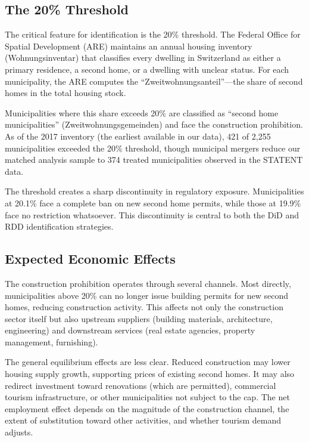 \documentclass[12pt]{article}
\begin{document}
\subsection{The 20\% Threshold}

The critical feature for identification is the 20\% threshold. The Federal Office for Spatial Development (ARE) maintains an annual housing inventory (Wohnungsinventar) that classifies every dwelling in Switzerland as either a primary residence, a second home, or a dwelling with unclear status. For each municipality, the ARE computes the ``Zweitwohnungsanteil''---the share of second homes in the total housing stock.

Municipalities where this share exceeds 20\% are classified as ``second home municipalities'' (Zweitwohnungsgemeinden) and face the construction prohibition. As of the 2017 inventory (the earliest available in our data), 421 of 2,255 municipalities exceeded the 20\% threshold, though municipal mergers reduce our matched analysis sample to 374 treated municipalities observed in the STATENT data.

The threshold creates a sharp discontinuity in regulatory exposure. Municipalities at 20.1\% face a complete ban on new second home permits, while those at 19.9\% face no restriction whatsoever. This discontinuity is central to both the DiD and RDD identification strategies.

\subsection{Expected Economic Effects}

The construction prohibition operates through several channels. Most directly, municipalities above 20\% can no longer issue building permits for new second homes, reducing construction activity. This affects not only the construction sector itself but also upstream suppliers (building materials, architecture, engineering) and downstream services (real estate agencies, property management, furnishing).

The general equilibrium effects are less clear. Reduced construction may lower housing supply growth, supporting prices of existing second homes. It may also redirect investment toward renovations (which are permitted), commercial tourism infrastructure, or other municipalities not subject to the cap. The net employment effect depends on the magnitude of the construction channel, the extent of substitution toward other activities, and whether tourism demand adjusts.
\end{document}

